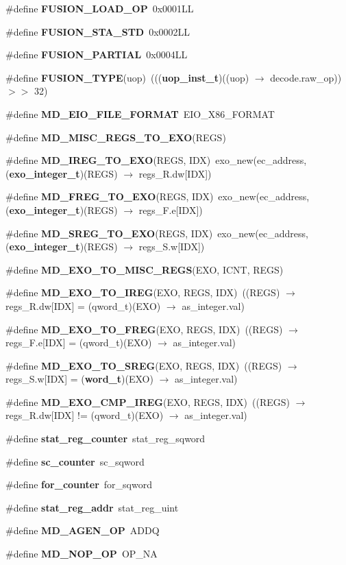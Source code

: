 \begin{CompactItemize}
\#define {\bf FUSION\_\-LOAD\_\-OP}~0x0001LL
\item 
\#define {\bf FUSION\_\-STA\_\-STD}~0x0002LL
\item 
\#define {\bf FUSION\_\-PARTIAL}~0x0004LL
\item 
\#define {\bf FUSION\_\-TYPE}(uop)~((({\bf uop\_\-inst\_\-t})((uop) $\rightarrow$ decode.raw\_\-op)) $>$$>$ 32)
\item 
\#define {\bf MD\_\-EIO\_\-FILE\_\-FORMAT}~EIO\_\-X86\_\-FORMAT
\item 
\#define {\bf MD\_\-MISC\_\-REGS\_\-TO\_\-EXO}(REGS)
\item 
\#define {\bf MD\_\-IREG\_\-TO\_\-EXO}(REGS, IDX)~exo\_\-new(ec\_\-address, ({\bf exo\_\-integer\_\-t})(REGS) $\rightarrow$ regs\_\-R.dw[IDX])
\item 
\#define {\bf MD\_\-FREG\_\-TO\_\-EXO}(REGS, IDX)~exo\_\-new(ec\_\-address, ({\bf exo\_\-integer\_\-t})(REGS) $\rightarrow$ regs\_\-F.e[IDX])
\item 
\#define {\bf MD\_\-SREG\_\-TO\_\-EXO}(REGS, IDX)~exo\_\-new(ec\_\-address, ({\bf exo\_\-integer\_\-t})(REGS) $\rightarrow$ regs\_\-S.w[IDX])
\item 
\#define {\bf MD\_\-EXO\_\-TO\_\-MISC\_\-REGS}(EXO, ICNT, REGS)
\item 
\#define {\bf MD\_\-EXO\_\-TO\_\-IREG}(EXO, REGS, IDX)~((REGS) $\rightarrow$ regs\_\-R.dw[IDX] = (qword\_\-t)(EXO) $\rightarrow$ as\_\-integer.val)
\item 
\#define {\bf MD\_\-EXO\_\-TO\_\-FREG}(EXO, REGS, IDX)~((REGS) $\rightarrow$ regs\_\-F.e[IDX] = (qword\_\-t)(EXO) $\rightarrow$ as\_\-integer.val)
\item 
\#define {\bf MD\_\-EXO\_\-TO\_\-SREG}(EXO, REGS, IDX)~((REGS) $\rightarrow$ regs\_\-S.w[IDX] = ({\bf word\_\-t})(EXO) $\rightarrow$ as\_\-integer.val)
\item 
\#define {\bf MD\_\-EXO\_\-CMP\_\-IREG}(EXO, REGS, IDX)~((REGS) $\rightarrow$ regs\_\-R.dw[IDX] != (qword\_\-t)(EXO) $\rightarrow$ as\_\-integer.val)
\item 
\#define {\bf stat\_\-reg\_\-counter}~stat\_\-reg\_\-sqword
\item 
\#define {\bf sc\_\-counter}~sc\_\-sqword
\item 
\#define {\bf for\_\-counter}~for\_\-sqword
\item 
\#define {\bf stat\_\-reg\_\-addr}~stat\_\-reg\_\-uint
\item 
\#define {\bf MD\_\-AGEN\_\-OP}~ADDQ
\item 
\#define {\bf MD\_\-NOP\_\-OP}~OP\_\-NA
$$
\end{CompactItemize}
